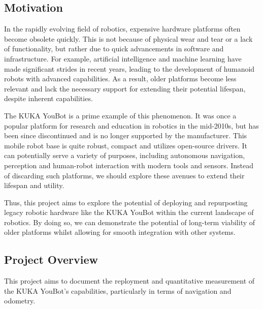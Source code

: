 \documentclass[a4paper, 12pt]{article}
\newif\ifshowadi
\newcommand{\adi}[1]{\ifshowadi\textcolor{red}{#1}\fi}
\newif\ifshownotes
\newcommand{\notes}[1]{\ifshownotes\textcolor{blue}{#1}\fi}
\begin{document}
    \subsection{Motivation}

    In the rapidly evolving field of robotics, expensive hardware platforms often become obsolete quickly. This is not because of physical wear and tear or a lack of functionality, but rather due to quick advancements in software and infrastructure. For example, artificial intelligence and machine learning have made significant strides in recent years, leading to the development of humanoid robots with advanced capabilities. As a result, older platforms become less relevant and lack the necessary support for extending their potential lifespan, despite inherent capabilities. 

    The KUKA YouBot is a prime example of this phenomenon. It was once a popular platform for research and education in robotics in the mid-2010s, but has been since discontinued and is no longer supported by the manufacturer. This mobile robot base is quite robust, compact and utilizes open-source drivers. It can potentially serve a variety of purposes, including autonomous navigation, perception and human-robot interaction with modern tools and sensors. Instead of discarding such platforms, we should explore these avenues to extend their lifespan and utility. 
    
    Thus, this project aims to explore the potential of deploying and repurposting legacy robotic hardware like the KUKA YouBot within the current landscape of robotics. By doing so, we can demonstrate the potential of long-term viability of older platforms whilst allowing for smooth integration with other systems. 

    \subsection{Project Overview}

    This project aims to document the reployment and quantitative measurement of the KUKA YouBot's capabilities, particularly in terms of navigation and odometry. 
\end{document}
